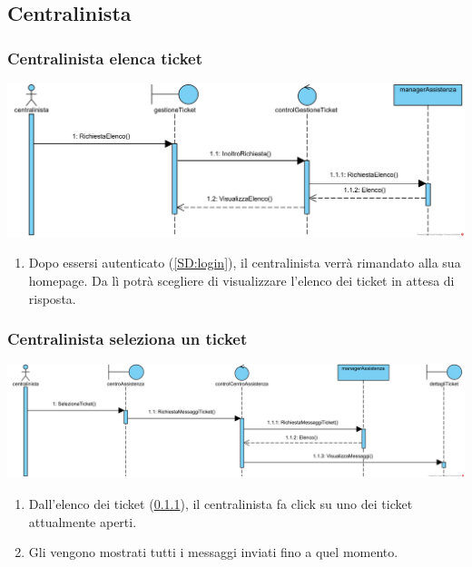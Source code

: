 \documentclass[12pt,a4paper]{article}
\begin{document}
\newpage

\subsection{Centralinista}

\subsubsection{Centralinista elenca ticket}
\label{SD:centralinistaelencaticket}

\begin{center}
\includegraphics[width=\textwidth]{SequenceDiagram/CentralinistaApreElencoTicket}
\end{center}

\begin{enumerate}
\item Dopo essersi autenticato (\ref{SD:login}), il centralinista verrà rimandato alla sua homepage. Da lì potrà scegliere di visualizzare l'elenco dei ticket in attesa di risposta.
\end{enumerate}

\subsubsection{Centralinista seleziona un ticket}
\label{SD:selezioneticketcentralinista}

\begin{center}
\includegraphics[width=\textwidth]{SequenceDiagram/CentralinistaSelezionaTicket}
\end{center}

\begin{enumerate}
\item Dall'elenco dei ticket (\ref{SD:centralinistaelencaticket}), il centralinista fa click su uno dei ticket attualmente aperti.
\item Gli vengono mostrati tutti i messaggi inviati fino a quel momento.
\end{enumerate}
\end{document}
